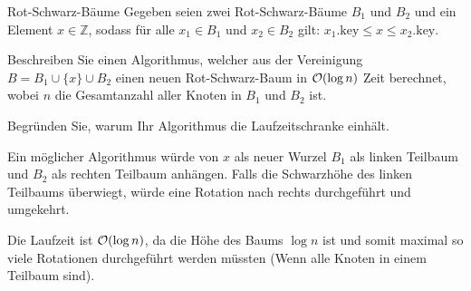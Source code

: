 \documentclass{article}
\begin{document}
\begin{eexercises}{Rot-Schwarz-Bäume}{
    Gegeben seien zwei Rot-Schwarz-Bäume $B_1$ und $B_2$ und ein Element $x \in \mathbb{Z}$, sodass für alle $x_1 \in B_1$ und $x_2 \in B_2$ gilt: $x_1.\text{key} \leq x \leq x_2.\text{key}$.
  }
  \item Beschreiben Sie einen Algorithmus, welcher aus der Vereinigung $B = B_1 \cup \{x\} \cup B_2$ einen neuen Rot-Schwarz-Baum in $\mathcal{O}(\log n)$ Zeit berechnet, wobei $n$ die Gesamtanzahl aller Knoten in $B_1$ und $B_2$ ist.
  \item Begründen Sie, warum Ihr Algorithmus die Laufzeitschranke einhält.
\end{eexercises}

\begin{solutions}
  \item Ein möglicher Algorithmus würde von $x$ als neuer Wurzel $B_1$ als linken Teilbaum und $B_2$ als rechten Teilbaum anhängen. Falls die Schwarzhöhe des linken Teilbaums überwiegt, würde eine Rotation nach rechts durchgeführt und umgekehrt.
  \item Die Laufzeit ist $\mathcal{O}(\log n)$, da die Höhe des Baums $\log n$ ist und somit maximal so viele Rotationen durchgeführt werden müssten (Wenn alle Knoten in einem Teilbaum sind).
\end{solutions}
\end{document}
